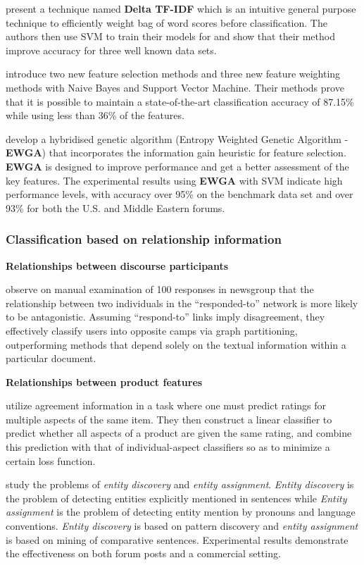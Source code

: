 \documentclass{article}
\begin{document}
\begin{multicols}{2}
        \citet{Martineau2009a} present a technique named \textbf{Delta TF-IDF}
which is an intuitive general purpose technique to efficiently weight bag of word 
scores before classification. The authors then use SVM to train their models 
for and show that their method improve accuracy for three well known data sets.

        \citet{Keefe2006} introduce two new feature selection methods and three
new feature weighting methods with Naive Bayes and Support Vector Machine.
Their methods prove that it is possible to maintain a state-of-the-art
classification accuracy of 87.15\% while using less than 36\% of the features.

        \citet{Abbasi2007} develop a hybridised genetic algorithm (Entropy
Weighted Genetic Algorithm - \textbf{EWGA}) that incorporates the information 
gain heuristic for feature selection. \textbf{EWGA} is designed to improve
performance and get a better assessment of the key features. The experimental
results using \textbf{EWGA} with SVM indicate high performance levels, with
accuracy over 95\% on the benchmark data set and over 93\% for both the U.S.
and Middle Eastern forums.


    \subsubsection{Classification based  on relationship information}
      \textbf{Relationships between discourse participants}
            
        \citet{Agrawal2003} observe on manual examination of 100
responses in newsgroup that the relationship between two individuals in the
``responded-to'' network is more likely to be antagonistic. Assuming
``respond-to'' links imply disagreement, they effectively classify users into
opposite camps via graph partitioning, outperforming methods that depend solely
on the textual information within a particular document.

      \textbf{Relationships between product features}
          
        \citet{Snyder2007} utilize agreement information in a task where
one must predict ratings for multiple aspects of the same item. They then
construct a linear classifier to predict whether all aspects of a product are
given the same rating, and combine this prediction with that of
individual-aspect classifiers so as to minimize a certain loss function.
\cite{Snyder2007}

        \citet{Ding2009} study the problems of \textit{entity discovery} and
\textit{entity assignment}. \textit{Entity discovery} is the problem of
detecting entities explicitly mentioned in sentences while \textit{Entity
assignment} is the problem of detecting entity mention by pronouns and language
conventions. \textit{Entity discovery} is based on pattern discovery and
\textit{entity assignment} is based on mining of comparative sentences. 
Experimental results demonstrate the effectiveness on both forum posts and 
a commercial setting.
        

\end{multicols}
\end{document}
